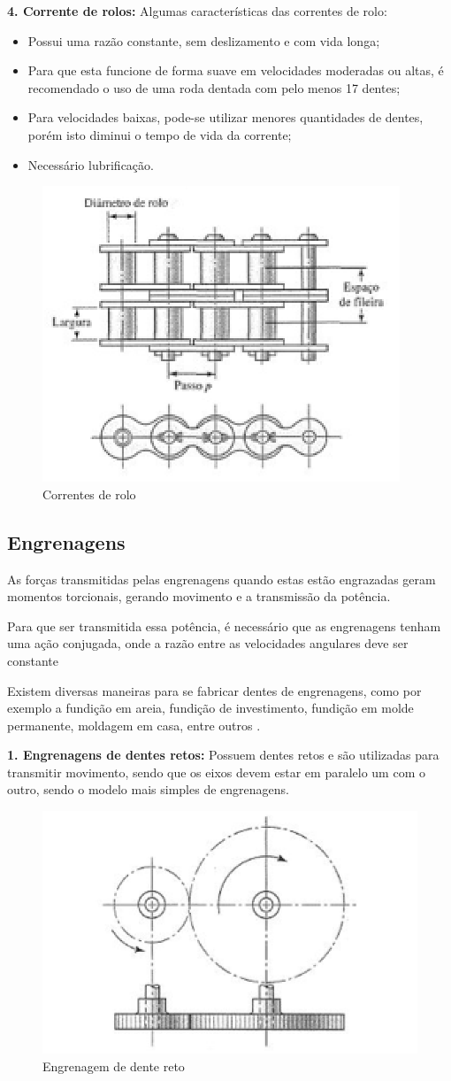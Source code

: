 \textbf{4. Corrente de rolos:}
Algumas características das correntes de rolo:
    
\begin{itemize}
\item Possui uma razão constante, sem deslizamento e com vida longa;
\item Para que esta funcione de forma suave em velocidades moderadas ou altas, é recomendado o uso de uma roda dentada com pelo menos 17 dentes;
\item Para velocidades baixas, pode-se utilizar menores quantidades de dentes, porém isto diminui o tempo de vida da corrente;
\item Necessário lubrificação.
\end{itemize}

 \begin{figure}[ht]
		\centering
		\includegraphics[width=.4\textwidth]{figuras/corrente.png}
		\caption{Correntes de rolo}
		\label{fig:corrente}
	\end{figure} 

\subsection{Engrenagens}
As forças transmitidas pelas engrenagens quando estas estão engrazadas geram momentos torcionais, gerando movimento e a transmissão da potência.

\par Para que ser transmitida essa potência, é necessário que as engrenagens tenham uma ação conjugada, onde a razão entre as velocidades angulares deve ser constante

\par Existem diversas maneiras para se fabricar dentes de engrenagens, como por exemplo a fundição em areia, fundição de investimento, fundição em molde permanente, moldagem em casa, entre outros \cite{Projmaq}.

\textbf{1. Engrenagens de dentes retos:}
Possuem dentes retos e são utilizadas para transmitir movimento, sendo que os eixos devem estar em paralelo um com o outro, sendo o modelo mais simples de engrenagens.
\begin{figure}[ht]
		\centering
		\includegraphics[width=.4\textwidth]{figuras/reto.png}
		\caption{Engrenagem de dente reto }
		\label{fig:reto}
	\end{figure}


